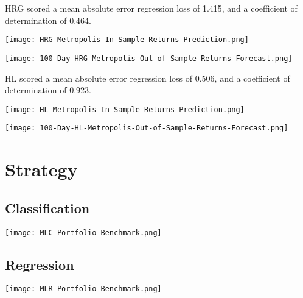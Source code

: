 HRG scored a mean absolute error regression loss of 1.415, and a coefficient of determination of 0.464.

\texttt{[image: HRG-Metropolis-In-Sample-Returns-Prediction.png]}

\texttt{[image: 100-Day-HRG-Metropolis-Out-of-Sample-Returns-Forecast.png]}

HL scored a mean absolute error regression loss of 0.506, and a coefficient of determination of 0.923.

\texttt{[image: HL-Metropolis-In-Sample-Returns-Prediction.png]}

\texttt{[image: 100-Day-HL-Metropolis-Out-of-Sample-Returns-Forecast.png]}

\section{Strategy}

\subsection{Classification}

\texttt{[image: MLC-Portfolio-Benchmark.png]}

\subsection{Regression}

\texttt{[image: MLR-Portfolio-Benchmark.png]}